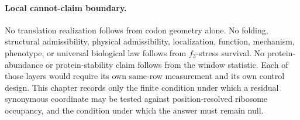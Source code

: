 \paragraph{Local cannot-claim boundary.}
No translation realization follows from codon geometry alone.  No folding, structural admissibility, physical admissibility, localization, function, mechanism, phenotype, or universal biological law follows from $f_3$-stress survival.  No protein-abundance or protein-stability claim follows from the window statistic.  Each of those layers would require its own same-row measurement and its own control design.  This chapter records only the finite condition under which a residual synonymous coordinate may be tested against position-resolved ribosome occupancy, and the condition under which the answer must remain null.
